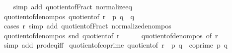 \begin{isabellebody}
%
\isadelimproof
\ \ %
\endisadelimproof
%
\isatagproof
{}\isamarkupfalse%
\ {\isacharparenleft}{\kern0pt}simp\ add{\isacharcolon}{\kern0pt}\ quotient{\isacharunderscore}{\kern0pt}of{\isacharunderscore}{\kern0pt}Fract\ normalize{\isacharunderscore}{\kern0pt}eq{\isacharparenright}{\kern0pt}%
\endisatagproof
{\isafoldproof}%
%
\isadelimproof
\isanewline
%
\endisadelimproof
\isanewline
{}\isamarkupfalse%
\ quotient{\isacharunderscore}{\kern0pt}of{\isacharunderscore}{\kern0pt}denom{\isacharunderscore}{\kern0pt}pos{\isacharcolon}{\kern0pt}\ {\isachardoublequoteopen}quotient{\isacharunderscore}{\kern0pt}of\ r\ {\isacharequal}{\kern0pt}\ {\isacharparenleft}{\kern0pt}p{\isacharcomma}{\kern0pt}\ q{\isacharparenright}{\kern0pt}\ {\isasymLongrightarrow}\ q\ {\isachargreater}{\kern0pt}\ {}{\isachardoublequoteclose}\isanewline
%
\isadelimproof
\ \ %
\endisadelimproof
%
\isatagproof
{}\isamarkupfalse%
\ {\isacharparenleft}{\kern0pt}cases\ r{\isacharparenright}{\kern0pt}\ {\isacharparenleft}{\kern0pt}simp\ add{\isacharcolon}{\kern0pt}\ quotient{\isacharunderscore}{\kern0pt}of{\isacharunderscore}{\kern0pt}Fract\ normalize{\isacharunderscore}{\kern0pt}denom{\isacharunderscore}{\kern0pt}pos{\isacharparenright}{\kern0pt}%
\endisatagproof
{\isafoldproof}%
%
\isadelimproof
\isanewline
%
\endisadelimproof
\isanewline
{}\isamarkupfalse%
\ quotient{\isacharunderscore}{\kern0pt}of{\isacharunderscore}{\kern0pt}denom{\isacharunderscore}{\kern0pt}pos{\isacharprime}{\kern0pt}{\isacharcolon}{\kern0pt}\ {\isachardoublequoteopen}snd\ {\isacharparenleft}{\kern0pt}quotient{\isacharunderscore}{\kern0pt}of\ r{\isacharparenright}{\kern0pt}\ {\isachargreater}{\kern0pt}\ {}{\isachardoublequoteclose}\isanewline
%
\isadelimproof
\ \ %
\endisadelimproof
%
\isatagproof
{}\isamarkupfalse%
\ quotient{\isacharunderscore}{\kern0pt}of{\isacharunderscore}{\kern0pt}denom{\isacharunderscore}{\kern0pt}pos\ {\isacharbrackleft}{\kern0pt}of\ r{\isacharbrackright}{\kern0pt}\ \isamarkupfalse%
\ {\isacharparenleft}{\kern0pt}simp\ add{\isacharcolon}{\kern0pt}\ prod{\isacharunderscore}{\kern0pt}eq{\isacharunderscore}{\kern0pt}iff{\isacharparenright}{\kern0pt}%
\endisatagproof
{\isafoldproof}%
%
\isadelimproof
\isanewline
%
\endisadelimproof
\isanewline
{}\isamarkupfalse%
\ quotient{\isacharunderscore}{\kern0pt}of{\isacharunderscore}{\kern0pt}coprime{\isacharcolon}{\kern0pt}\ {\isachardoublequoteopen}quotient{\isacharunderscore}{\kern0pt}of\ r\ {\isacharequal}{\kern0pt}\ {\isacharparenleft}{\kern0pt}p{\isacharcomma}{\kern0pt}\ q{\isacharparenright}{\kern0pt}\ {\isasymLongrightarrow}\ coprime\ p\ q{\isachardoublequoteclose}\isanewline

\end{isabellebody}
